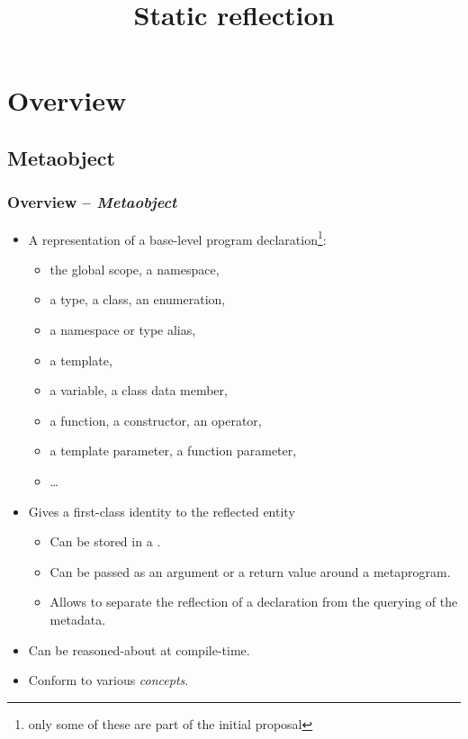 \documentclass[compress,table,xcolor=table]{beamer}
\begin{document}
\title{Static reflection}

\section{Overview}

\subsection{Metaobject}
\begin{frame}
\frametitle{Overview -- {\em Metaobject}}
  \begin{itemize}
    \small
    \item A representation of a base-level program declaration\footnote
      {only some of these are part of the initial proposal}:
    \begin{itemize}
      \scriptsize
      \item the global scope, a namespace,
      \item a type, a class, an enumeration,
      \item a namespace or type alias,
      \item a template,
      \item a variable, a class data member,
      \item a function, a constructor, an operator,
      \item a template parameter, a function parameter,
      \item \ldots
    \end{itemize}
    \item Gives a first-class identity to the reflected entity
    \begin{itemize}
      \scriptsize
      \item Can be stored in a .
      \item Can be passed as an argument or a return value around a metaprogram.
      \item Allows to separate the reflection of a declaration from
      the querying of the metadata.
    \end{itemize}
    \item Can be reasoned-about at compile-time.
    \item Conform to various {\em concepts}.
  \end{itemize}
\end{frame}
\end{document}
